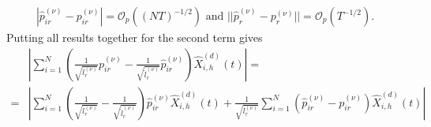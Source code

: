 \begin{equation} \label{pir}
\begin{split}
|\hat{p}^{(\nu)}_{ir}-p^{(\nu)}_{ir}|=\mathcal{O}_p\left((NT)^{-1/2} \right) \text{ and } || \hat{p}^{(\nu)}_r-p^{(\nu)}_r || =  \mathcal{O}_p\left(T^{-1/2}\right).
\end{split}
\end{equation}
Putting all results together for the second term gives
\begin{equation}
\begin{split}
&\left| \sum_{i=1}^N \left( \frac{1}{\sqrt{l_r^{(\nu)}}} p^{(\nu)}_{ir} - \frac{1}{\sqrt{\hat{l}_r^{(\nu)}}} \hat{p}^{(\nu)}_{ir} \right) \hat{X}^{(d)}_{i,h}(t) \right| = \\
=& \left|\sum_{i=1}^N \left( \frac{1}{\sqrt{l_r^{(\nu)}}} - \frac{1}{\sqrt{\hat{l}_r^{(\nu)}}} \right) \hat{p}^{(\nu)}_{ir} \hat{X}^{(d)}_{i,h}(t) + \frac{1}{\sqrt{l_r^{(\nu)}}} \sum_{i=1}^N \left( \hat{p}^{(\nu)}_{ir} - p^{(\nu)}_{ir}\right) \hat{X}^{(d)}_{i,h}(t)\right|\\

\end{split}
\end{equation}

